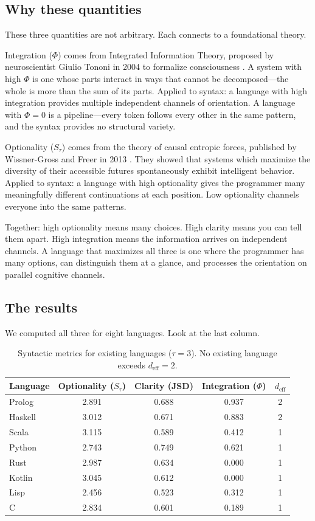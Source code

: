 \documentclass[11pt,a4paper]{article}
\newcommand{\Stau}{S_\tau}
\newcommand{\deff}{d_{\mathrm{eff}}}
\begin{document}
\subsection{Why these quantities}

These three quantities are not arbitrary. Each connects to a foundational theory.

Integration ($\Phi$) comes from Integrated Information Theory, proposed by neuroscientist Giulio Tononi in 2004 to formalize consciousness \cite{Tononi2004}. A system with high $\Phi$ is one whose parts interact in ways that cannot be decomposed---the whole is more than the sum of its parts. Applied to syntax: a language with high integration provides multiple independent channels of orientation. A language with $\Phi = 0$ is a pipeline---every token follows every other in the same pattern, and the syntax provides no structural variety.

Optionality ($\Stau$) comes from the theory of causal entropic forces, published by Wissner-Gross and Freer in 2013 \cite{WissnerGross2013}. They showed that systems which maximize the diversity of their accessible futures spontaneously exhibit intelligent behavior. Applied to syntax: a language with high optionality gives the programmer many meaningfully different continuations at each position. Low optionality channels everyone into the same patterns.

Together: high optionality means many choices. High clarity means you can tell them apart. High integration means the information arrives on independent channels. A language that maximizes all three is one where the programmer has many options, can distinguish them at a glance, and processes the orientation on parallel cognitive channels.

\subsection{The results}

We computed all three for eight languages. Look at the last column.

\begin{table}[H]
\centering
\caption{Syntactic metrics for existing languages ($\tau = 3$). No existing language exceeds $\deff = 2$.}
\label{tab:existing}
\begin{tabular}{lcccc}
\toprule
Language & Optionality ($\Stau$) & Clarity (JSD) & Integration ($\Phi$) & $\deff$ \\
\midrule
Prolog & 2.891 & 0.688 & 0.937 & 2 \\
Haskell & 3.012 & 0.671 & 0.883 & 2 \\
Scala & 3.115 & 0.589 & 0.412 & 1 \\
Python & 2.743 & 0.749 & 0.621 & 1 \\
Rust & 2.987 & 0.634 & 0.000 & 1 \\
Kotlin & 3.045 & 0.612 & 0.000 & 1 \\
Lisp & 2.456 & 0.523 & 0.312 & 1 \\
C & 2.834 & 0.601 & 0.189 & 1 \\
\bottomrule
\end{tabular}
\end{table}
\end{document}
